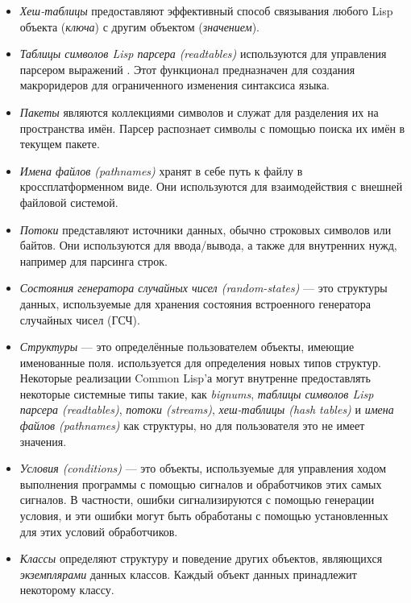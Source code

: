 \begin{itemize}
\item
\emph{Хеш-таблицы} предоставляют эффективный способ связывания
любого Lisp объекта (\emph{ключа}) с другим объектом (\emph{значением}). 

\item
\emph{Таблицы символов Lisp парсера (readtables)} используются для управления
парсером выражений . Этот функционал предназначен для создания
макроридеров для ограниченного изменения синтаксиса языка.

\item
\emph{Пакеты} являются коллекциями символов и служат для разделения их на 
пространства имён. Парсер распознает символы с помощью поиска
их имён в текущем пакете.

\item
\emph{Имена файлов (pathnames)} хранят в себе путь к файлу в кроссплатформенном
виде. Они используются для взаимодействия с внешней файловой
системой.

\item
\emph{Потоки} представляют источники данных, обычно строковых
символов или байтов. Они используются для ввода/вывода, а также для
внутренних нужд, например для парсинга строк. 

\item
\emph{Состояния генератора случайных чисел (random-states)} --- это структуры
данных, используемые для хранения состояния встроенного генератора случайных
чисел (ГСЧ).

\item
\emph{Структуры} --- это определённые пользователем объекты, имеющие
именованные поля.  используется для определения
новых типов структур. Некоторые реализации Common Lisp'а могут
внутренне предоставлять некоторые системные типы такие, как \emph{bignums},
\emph{таблицы символов Lisp парсера (readtables)}, \emph{потоки (streams)},
\emph{хеш-таблицы (hash tables)} и \emph{имена файлов (pathnames)} как
структуры, но для пользователя это не имеет значения.

\item
\emph{Условия (conditions)} --- это объекты, используемые для
управления ходом выполнения программы с помощью сигналов и
обработчиков этих самых сигналов. В частности, ошибки
сигнализируются с помощью генерации условия, и эти ошибки могут
быть обработаны с помощью установленных для этих условий обработчиков.

\item
\emph{Классы} определяют структуру и поведение других объектов,
являющихся \emph{экземплярами} данных классов. Каждый объект данных
принадлежит некоторому классу. 


\end{itemize}

